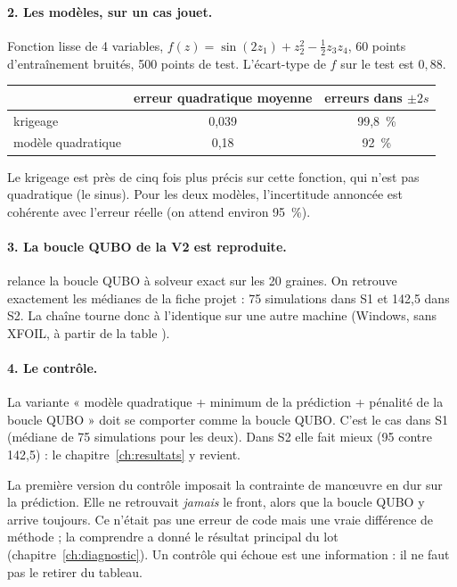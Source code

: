\paragraph{2. Les modèles, sur un cas jouet.} Fonction lisse de 4 variables, $f(z)=\sin(2z_1)+z_2^2-\tfrac12z_3z_4$, 60 points d'entraînement bruités, 500 points de test. L'écart-type de $f$ sur le test est $0{,}88$.
\begin{center}
\begin{tabular}{lcc}
\toprule
 & erreur quadratique moyenne & erreurs dans $\pm2s$ \\
\midrule
krigeage & 0,039 & 99,8~\% \\
modèle quadratique & 0,18 & 92~\% \\
\bottomrule
\end{tabular}
\end{center}
Le krigeage est près de cinq fois plus précis sur cette fonction, qui n'est pas quadratique (le sinus). Pour les deux modèles, l'incertitude annoncée est cohérente avec l'erreur réelle (on attend environ 95~\%).

\paragraph{3. La boucle QUBO de la V2 est reproduite.}  relance la boucle QUBO à solveur exact sur les 20 graines. On retrouve exactement les médianes de la fiche projet : 75 simulations dans S1 et 142,5 dans S2. La chaîne tourne donc à l'identique sur une autre machine (Windows, sans XFOIL, à partir de la table ).

\paragraph{4. Le contrôle.} La variante « modèle quadratique + minimum de la prédiction + pénalité de la boucle QUBO » doit se comporter comme la boucle QUBO. C'est le cas dans S1 (médiane de 75 simulations pour les deux). Dans S2 elle fait mieux (95 contre 142,5) : le chapitre~\ref{ch:resultats} y revient.

\begin{piege}
La première version du contrôle imposait la contrainte de manœuvre en dur sur la prédiction. Elle ne retrouvait \emph{jamais} le front, alors que la boucle QUBO y arrive toujours. Ce n'était pas une erreur de code mais une vraie différence de méthode ; la comprendre a donné le résultat principal du lot (chapitre~\ref{ch:diagnostic}). Un contrôle qui échoue est une information : il ne faut pas le retirer du tableau.
\end{piege}

